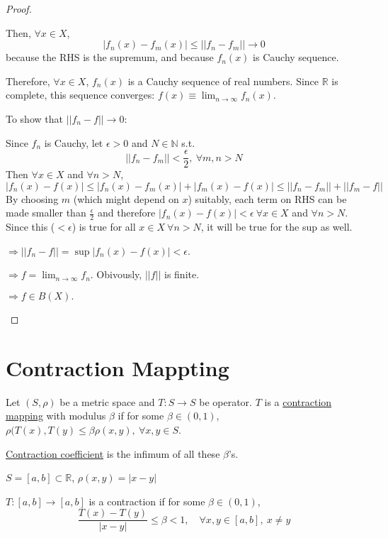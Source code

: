 \documentclass[twoside]{article}
\newcommand\imp{$\Longrightarrow$}
\newcommand\R{\mathbb{R}}
\begin{document}
\begin{proof}
\begin{enumerate}
        Then, $\forall x \in X$,
        \[
        |f_n(x) - f_{m}(x)| \leq ||f_n - f_m|| \longrightarrow 0
        \]
        because the RHS is the supremum, and because $f_{n}(x)$ is Cauchy sequence. 

        Therefore, $\forall x \in X$, $f_n(x)$ is a Cauchy sequence of real numbers. Since $\R$ is complete, this sequence converges: $f(x) \equiv \lim_{n \to \infty} f_{n}(x)$. 

        To show that $||f_n - f|| \to 0$:

        Since $f_{n}$ is Cauchy, let $\epsilon > 0$ and $N \in \mathbb{N}$ s.t.
        \[
        ||f_{n}- f_{m} || < \frac{\epsilon}{2}, ~ \forall m,n > N
        \]
        Then $\forall x \in X$ and $ \forall n > N$, 
        \[
        |f_n(x) - f(x)| \leq |f_n(x) - f_m(x)| + |f_m(x) - f(x)| \leq ||f_n - f_m|| + ||f_m - f||
        \]
        By choosing $m$ (which might depend on $x$) suitably, each term on RHS can be made smaller than $\frac{\epsilon}{2}$ and therefore $|f_n(x)-f(x)| < \epsilon ~ \forall x \in X$ and $\forall n > N$. Since this ($< \epsilon$) is true for all $x \in X~\forall n > N$, it will be true for the sup as well.

        \imp $||f_n- f|| = \sup |f_n(x) - f(x)| < \epsilon$.

        \imp $f = \lim_{n\to \infty} f_n$. Obivously, $||f||$ is finite.

        \imp $f \in B(X).$
    \end{enumerate}
\end{proof}

\section{Contraction Mappting}
Let $(S, \rho)$ be a metric space and $T:S \to S$ be operator. $T$ is a \underline{contraction mapping} with modulus $\beta$ if for some $\beta \in (0,1)$, $\rho(T(x),T(y) \leq \beta \rho(x,y), ~ \forall x,y \in S$.

\underline{Contraction coefficient} is the infimum of all these $\beta$'s.

\begin{example}
    $S = [a,b] \subset \R$, $\rho(x,y) = |x- y|$
\end{example}

\begin{theorem}
    $T: [a,b] \to [a,b]$ is a contraction if for some $\beta \in (0,1)$,
    \[
    \frac{T(x)-T(y)}{|x-y|} \leq \beta < 1, \quad \forall  x, y \in [a,b], ~x\neq y
    \]
\end{theorem}
\end{document}
